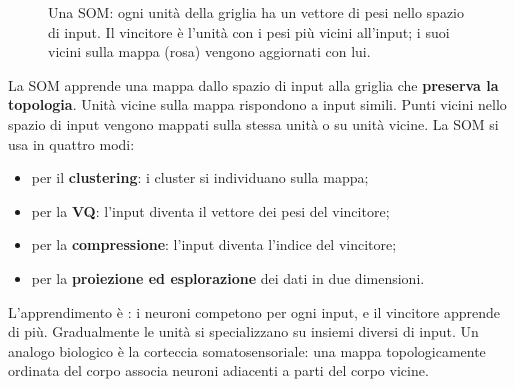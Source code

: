 \begin{figure}[ht]
\centering
{}
\caption{Una SOM: ogni unità della griglia ha un vettore di pesi nello spazio di input. Il vincitore è l'unità con i pesi
più vicini all'input; i suoi vicini sulla mappa (rosa) vengono aggiornati con lui.}
\label{fig:som-griglia}
\end{figure}

La SOM apprende una mappa dallo spazio di input alla griglia che \textbf{preserva la topologia}. Unità vicine sulla
mappa rispondono a input simili. Punti vicini nello spazio di input vengono mappati sulla stessa unità o su unità
vicine. La SOM si usa in quattro modi:
\begin{itemize}
  \item per il \textbf{clustering}: i cluster si individuano sulla mappa;
  \item per la \textbf{VQ}: l'input diventa il vettore dei pesi del vincitore;
  \item per la \textbf{compressione}: l'input diventa l'indice del vincitore;
  \item per la \textbf{proiezione ed esplorazione} dei dati in due dimensioni.
\end{itemize}

L'apprendimento è : i neuroni competono per ogni input, e il vincitore apprende di più.
Gradualmente le unità si specializzano su insiemi diversi di input. Un analogo biologico è la corteccia
somatosensoriale: una mappa topologicamente ordinata del corpo associa neuroni adiacenti a parti del corpo vicine.

